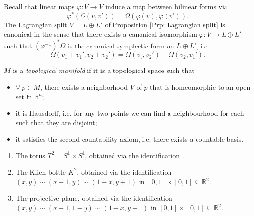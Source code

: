 \documentclass[12pt]{book}
\begin{document}
\begin{Rmk}\label{Rmk: The Lagrangian split is canonical}
    Recall that linear maps $\varphi:V\to V$ induce a map between bilinear forms via
    \[
    \varphi^\ast(\Omega(v,v')) = \Omega(\varphi(v),\varphi(v')).
    \] 
    The Lagrangian split $V=L\oplus L'$ of Proposition \ref{Prp: Lagrangian split} is canonical in the sense that there exists a canonical isomorphism $\varphi:V\to L\oplus L'$ such that $(\varphi^{-1})^\ast\Omega$ is the canonical symplectic form on $L\oplus L'$, i.e.
    \[
    \Omega(v_1+v_1', v_2+v_2') = \Omega(v_1,v_2') - \Omega(v_2,v_1').
    \] 
    
\end{Rmk}

\begin{Dfn}\label{Dfn: Topological manifold}
    $M$ is a \emph{topological manifold} if it is a topological space such that
    \begin{itemize}
    
        \item $\forall \ p\in M$, there exists a neighborhood $V$ of $p$ that is homeomorphic to an open set in $\mathbb{R}^n$;

        \item it is Hausdorff, i.e. for any two points we can find a neighbourhood for each such that they are disjoint;

        \item it satisfies the second countability axiom, i.e. there exists a countable basis.
    \end{itemize}
\end{Dfn}

\begin{Exp}\leavevmode
    \begin{enumerate}[label=\ExpLbl]
    
        \item The torus $T^2=S^1\times S^1$, obtained via the identification .

        \item The Klien bottle $K^2$, obtained via the identification $(x,y)\sim (x+1,y)\sim (1-x,y+1)$ in $[0,1]\times[0,1]\subseteq \mathbb{R}^2$.

        \item The projective plane, obtained via the identification $(x,y)\sim (x+1,1-y)\sim (1-x,y+1)$ in $[0,1]\times[0,1]\subseteq \mathbb{R}^2$.
    \end{enumerate}
\end{Exp}
\end{document}
